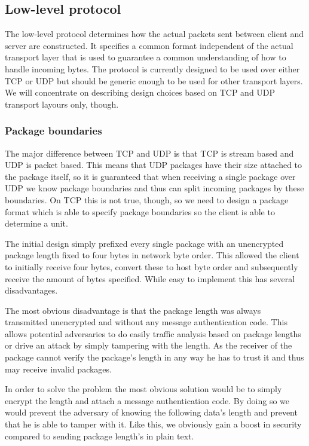 \subsection{Low-level protocol}
\label{sec:low-level-protocol}

The low-level protocol determines how the actual packets sent between client and server are constructed.
It specifies a common format independent of the actual transport layer that is used to guarantee a common understanding of how to handle incoming bytes.
The protocol is currently designed to be used over either TCP or UDP but should be generic enough to be used for other transport layers.
We will concentrate on describing design choices based on TCP and UDP transport layours only, though.

\subsubsection{Package boundaries}

The major difference between TCP and UDP is that TCP is stream based and UDP is packet based.
This means that UDP packages have their size attached to the package itself, so it is guaranteed that when receiving a single package over UDP we know package boundaries and thus can split incoming packages by these boundaries.
On TCP this is not true, though, so we need to design a package format which is able to specify package boundaries so the client is able to determine a unit.

The initial design simply prefixed every single package with an unencrypted package length fixed to four bytes in network byte order.
This allowed the client to initially receive four bytes, convert these to host byte order and subsequently receive the amount of bytes specified.
While easy to implement this has several disadvantages.

The most obvious disadvantage is that the package length was always transmitted unencrypted and without any message authentication code.
This allows potential adversaries to do easily traffic analysis based on package lengths or drive an attack by simply tampering with the length.
As the receiver of the package cannot verify the package's length in any way he has to trust it and thus may receive invalid packages.

In order to solve the problem the most obvious solution would be to simply encrypt the length and attach a message authentication code.
By doing so we would prevent the adversary of knowing the following data's length and prevent that he is able to tamper with it.
Like this, we obviously gain a boost in security compared to sending package length's in plain text.


